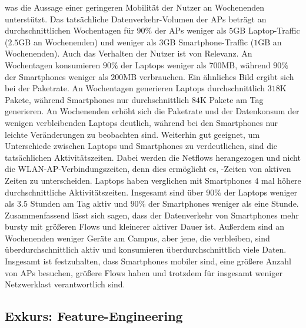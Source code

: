 \documentclass[12pt, a4paper]{article}
\begin{document}
was die Aussage einer geringeren Mobilität der Nutzer an Wochenenden unterstützt. \cite{Alipour2018}
Das tatsächliche Datenverkehr-Volumen der APs beträgt an durchschnittlichen Wochentagen für $90 \%$ der APs
weniger als $5$\textsc{GB} Laptop-Traffic ($2.5$\textsc{GB} an Wochenenden) und weniger als $3$\textsc{GB} Smartphone-Traffic
($1$\textsc{GB} an Wochenenden). Auch das Verhalten der Nutzer ist von Relevanz. An Wochentagen konsumieren $90 \%$ der 
Laptops weniger als $700$\textsc{MB}, während $90 \%$ der Smartphones weniger als $200$\textsc{MB} verbrauchen.
Ein ähnliches Bild ergibt sich bei der Paketrate. An Wochentagen generieren Laptops durchschnittlich $318$\textsc{K} Pakete, 
während Smartphones nur durchschnittlich $84$\textsc{K} Pakete am Tag generieren. 
An Wochenenden erhöht sich die Paketrate und der Datenkonsum der wenigen verbleibenden Laptops deutlich,
während bei den Smartphones nur leichte Veränderungen zu beobachten sind.
Weiterhin gut geeignet, um Unterschiede zwischen Laptops und Smartphones zu verdeutlichen, sind die tatsächlichen Aktivitätszeiten.
Dabei werden die Netflows herangezogen und nicht die WLAN-AP-Verbindungszeiten, denn dies ermöglicht es, -Zeiten
von aktiven Zeiten zu unterscheiden. Laptops haben verglichen mit Smartphones $4$ mal höhere durchschnittliche Aktivitätszeiten.
Insgesamt sind über $90 \%$ der Laptops weniger als $3.5$ Stunden am Tag aktiv und $90 \%$ der Smartphones weniger als eine Stunde.\newline
Zusammenfassend lässt sich sagen, dass der Datenverkehr von Smartphones mehr bursty mit größeren Flows und kleinerer aktiver
Dauer ist. Außerdem sind an Wochenenden weniger Geräte am Campus, aber jene, die verbleiben, sind überdurchschnittlich aktiv 
und konsumieren überdurchschnittlich viele Daten. Insgesamt ist festzuhalten, dass Smartphones mobiler sind, 
eine größere Anzahl von APs besuchen, größere Flows haben und trotzdem für insgesamt weniger Netzwerklast verantwortlich sind.

\subsection{Exkurs: Feature-Engineering}
\label{sec:digression}
\end{document}
